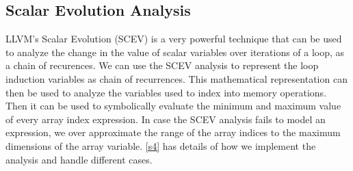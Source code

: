 \subsection{Scalar Evolution Analysis}\vspace{-5pt}
LLVM's Scalar Evolution (SCEV) is a very powerful technique
that can be used to analyze the change in 
the value of scalar variables over iterations of a loop, as a chain 
of recurences. 
We can use the SCEV analysis to represent the loop induction variables 
as chain of recurrences. 
This mathematical representation 
can then be used to analyze the variables used to index into memory 
operations. 
Then it can be used to symbolically evaluate the 
minimum and maximum value of every array index expression. 
In case the SCEV analysis fails to model an expression, 
we over approximate the range of the array indices to the 
maximum dimensions of the array variable. 
\autoref{s4} has details 
of how we implement the analysis and handle different cases. 
